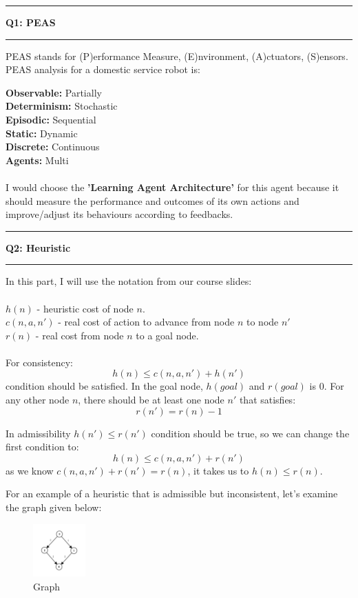 \documentclass[11pt]{article}
\newcommand\question[2]{\vspace{.25in}\hrule\textbf{#1: #2}\vspace{.5em}\hrule\vspace{.10in}}
\begin{document}
\raggedright
	\newcommand\NAME{Muhammed Burak Bugrul}
	\newcommand\ANDREWID{150140015}
	\newcommand\HWNUM{1}
	\question{Q1}{PEAS}
	PEAS stands for (P)erformance Measure, (E)nvironment, (A)ctuators, (S)ensors. PEAS analysis for a domestic service robot is:
	
	\textbf{Observable:} Partially \\
	\textbf{Determinism:} Stochastic \\
	\textbf{Episodic:} Sequential \\
	\textbf{Static:} Dynamic \\
	\textbf{Discrete:} Continuous \\
	\textbf{Agents:} Multi \\ \ \\
	
	I would choose the \textbf{'Learning Agent Architecture'} for this agent because it should measure the performance and outcomes of its own actions and improve/adjust its behaviours according to feedbacks.
	\question{Q2}{Heuristic}
	
	In this part, I will use the notation from our course slides:\\ \ \\
	
	$h(n)$ - heuristic cost of node $n$.\\
	$c(n, a, n')$ - real cost of action to advance from node $n$ to node $n'$\\
	$r(n)$ - real cost from node $n$ to a goal node.\\ \ \\
	
	For consistency:
	$$h(n) \leq c(n, a, n') + h(n')$$
	condition should be satisfied. In the goal node, $h(goal)$ and $r(goal)$ is 0. For any other node $n$, there should be at least one node $n'$ that satisfies:
	$$r(n') = r(n) - 1$$
	
	In admissibility $h(n') \leq r(n')$ condition should be true, so we can change the first condition to:
	$$h(n) \leq c(n, a, n') + r(n')$$
	as we know $c(n, a, n') + r(n') = r(n)$, it takes us to $h(n) \leq r(n)$.
	
	For an example of a heuristic that is admissible but inconsistent, let's examine the graph given below:
	
	\begin{figure}[h!]
		\centering
		\includegraphics[width=0.18\textwidth]{images/graph.png}
		\caption{Graph}
		\label{fig:Graph}
	\end{figure}
\end{document}
